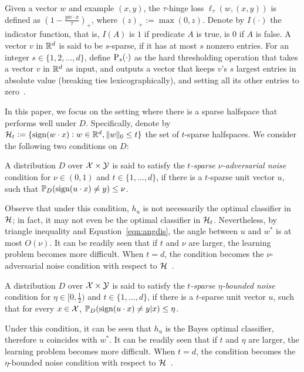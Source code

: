 Given a vector $w$ and example $(x,y)$, the $\tau$-hinge loss $\ell_{\tau}(w, (x, y))$ is defined as $(1 - \frac{y w \cdot x}{\tau})_+$, where $(z)_+:=\max(0, z)$. Denote by $I(\cdot)$ the indicator function, that is, $I(A)$ is $1$ if predicate $A$ is true, is $0$ if $A$ is false.
A vector $v$ in $\mathbb{R}^d$ is said to be $s$-sparse, if it has at most $s$ nonzero entries.
For an integer $s \in \{1,2,\ldots,d\}$, define $\operatorname{P}_s(\cdot)$ as the hard thresholding operation that takes a vector $v$ in $\mathbb{R}^d$ as input, and outputs a vector that keeps $v$'s $s$ largest entries in absolute value (breaking ties lexicographically), and setting all its other entries to zero~\citep{BD09}.

In this paper, we focus on the setting where there is a sparse halfspace that performs well under $D$.
Specifically, denote by $\mathcal{H}_t := \{\operatorname{sign}(w \cdot x): w \in \mathbb{R}^d, \| w \|_0 \leq t \}$ the set of $t$-sparse halfspaces.
We consider the following two conditions on $D$:

\begin{definition}
A distribution $D$ over $\mathcal{X} \times \mathcal{Y}$ is said to satisfy the {\em $t$-sparse $\nu$-adversarial noise} condition for $\nu \in (0,1)$ and $t \in \{1,\ldots,d\}$, if there is a $t$-sparse unit vector $u$, such that $\mathbb{P}_D(\operatorname{sign}(u \cdot x) \neq y) \leq \nu$.
\label{def:an}
\end{definition}
Observe that under this condition, $h_u$ is not necessarily the optimal classifier in $\mathcal{H}$; in fact, it may not even be the optimal classifier in $\mathcal{H}_t$. Nevertheless, by triangle inequality and Equation~\eqref{eqn:angdis}, the angle between $u$ and $w^*$ is at most $O(\nu)$.
It can be readily seen that if $t$ and $\nu$ are larger, the learning problem becomes more difficult. When $t = d$, the condition becomes the $\nu$-adversarial noise condition with respect to $\mathcal{H}$~\citep{ABL17}.

\begin{definition}
A distribution $D$ over $\mathcal{X} \times \mathcal{Y}$ is said to satisfy the {\em $t$-sparse $\eta$-bounded noise} condition for $\eta \in [0,\frac 1 2)$ and $t \in \{1,\ldots,d\}$, if there is a $t$-sparse unit vector $u$, such that
for every $x \in \mathcal{X}$, $\mathbb{P}_D(\operatorname{sign}(u \cdot x) \neq y | x) \leq \eta$.
\label{def:bn}
\end{definition}
Under this condition, it can be seen that $h_u$ is the Bayes optimal classifier, therefore $u$ coincides with $w^*$.
It can be readily seen that if $t$ and $\eta$ are larger, the learning problem becomes more difficult. When $t = d$, the condition becomes the $\eta$-bounded noise condition with respect to $\mathcal{H}$~\citep{MN06}.


